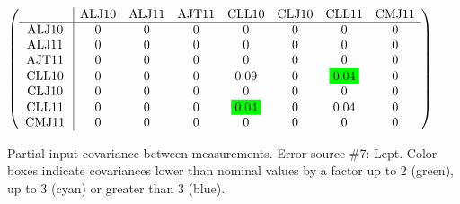 \begin{table}[H]
\scriptsize
\begin{center}
\renewcommand{\arraystretch}{1.1}
\begin{math}\left(\begin{array}{c|ccccccc}
 & \mathrm{ALJ10} & 
\mathrm{ALJ11} & 
\mathrm{AJT11} & 
\mathrm{CLL10} & 
\mathrm{CLJ10} & 
\mathrm{CLL11} & 
\mathrm{CMJ11} \\
\hline
\mathrm{ALJ10} \hspace*{2pt} &  0 &  0 &  0 &  0 &  0 &  0 &  0 \\
\mathrm{ALJ11} \hspace*{2pt} &  0 &  0 &  0 &  0 &  0 &  0 &  0 \\
\mathrm{AJT11} \hspace*{2pt} &  0 &  0 &  0 &  0 &  0 &  0 &  0 \\
\mathrm{CLL10} \hspace*{2pt} &  0 &  0 &  0 &       0.09 &  0 &  \colorbox{Green1}{$      0.04$} &  0 \\
\mathrm{CLJ10} \hspace*{2pt} &  0 &  0 &  0 &  0 &  0 &  0 &  0 \\
\mathrm{CLL11} \hspace*{2pt} &  0 &  0 &  0 &  \colorbox{Green1}{$      0.04$} &  0 &       0.04 &  0 \\
\mathrm{CMJ11} \hspace*{2pt} &  0 &  0 &  0 &  0 &  0 &  0 &  0 \\
\end{array}\right)\end{math}
\caption{Partial input covariance between measurements. Error source \#7: Lept. Color boxes indicate covariances lower than nominal values by a factor up to 2 (green), up to 3 (cyan) or greater than 3 (blue).}
\renewcommand{\arraystretch}{1}
\end{center}
\end{table}
